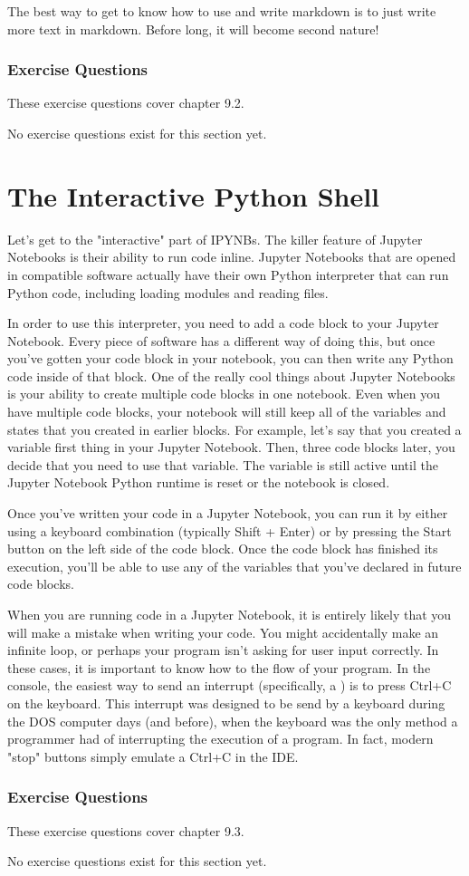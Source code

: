 The best way to get to know how to use and write markdown is to just write more text in markdown. Before long, it will become second nature!\par
\subsubsection*{Exercise Questions}
These exercise questions cover chapter 9.2.

No exercise questions exist for this section yet.
\section{The Interactive Python Shell}
Let's get to the "interactive" part of IPYNBs. The killer feature of Jupyter Notebooks is their ability to run code inline. Jupyter Notebooks that are opened in compatible software actually have their own Python interpreter that can run Python code, including loading modules and reading files.\par
In order to use this interpreter, you need to add a code block to your Jupyter Notebook. Every piece of software has a different way of doing this, but once you've gotten your code block in your notebook, you can then write any Python code inside of that block. One of the really cool things about Jupyter Notebooks is your ability to create multiple code blocks in one notebook. Even when you have multiple code blocks, your notebook will still keep all of the variables and states that you created in earlier blocks. For example, let's say that you created a variable first thing in your Jupyter Notebook. Then, three code blocks later, you decide that you need to use that variable. The variable is still active until the Jupyter Notebook Python runtime is reset or the notebook is closed.\par
Once you've written your code in a Jupyter Notebook, you can run it by either using a keyboard combination (typically Shift + Enter) or by pressing the Start button on the left side of the code block. Once the code block has finished its execution, you'll be able to use any of the variables that you've declared in future code blocks.\par
When you are running code in a Jupyter Notebook, it is entirely likely that you will make a mistake when writing your code. You might accidentally make an infinite loop, or perhaps your program isn't asking for user input correctly. In these cases, it is important to know how to  the flow of your program. In the console, the easiest way to send an interrupt (specifically, a ) is to press Ctrl+C on the keyboard. This interrupt was designed to be send by a keyboard during the DOS computer days (and before), when the keyboard was the only method a programmer had of interrupting the execution of a program. In fact, modern "stop" buttons simply emulate a Ctrl+C in the IDE. 
\subsubsection*{Exercise Questions}
These exercise questions cover chapter 9.3.

No exercise questions exist for this section yet.